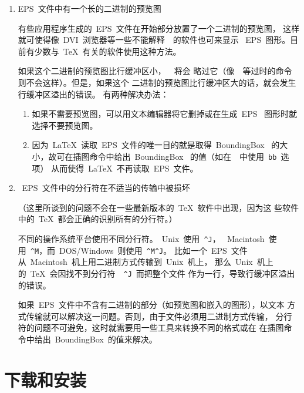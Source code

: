 \begin{enumerate}
	\item { EPS~文件中有一个长的二进制的预览图}
	
	有些应用程序生成的~EPS~文件在开始部分放置了一个二进制的预览图，
	这样就可使得像~DVI~浏览器等一些不能解释~\PS~的软件也可来显示
	~EPS~图形。目前有少数与~\TeX{}~有关的软件使用这种方法。
	
	如果这个二进制的预览图比行缓冲区小，~~将会
	略过它（像~~等过时的命令则不会这样）。但是，如果这个
	二进制的预览图比行缓冲区大的话，就会发生行缓冲区溢出的错误。
	有两种解决办法：
	
	\begin{enumerate}
		\item 如果不需要预览图，可以用文本编辑器将它删掉或在生成~EPS~
		图形时就选择不要预览图。
		\item 因为~\LaTeX{}~读取~EPS~文件的唯一目的就是取得~BoundingBox~
		的大小，故可在插图命令中给出~BoundingBox~
		的值（如在~~中使用~\texttt{bb}~选项）
		从而使得~\LaTeX{}~不再读取~EPS~文件。
	\end{enumerate}
	
	\item { ~EPS~文件中的分行符在不适当的传输中被损坏}
	
	（这里所谈到的问题不会在一些最新版本的~\TeX{}~软件中出现，因为这
	些软件中的~\TeX{}~都会正确的识别所有的分行符。）
	
	不同的操作系统平台使用不同分行符。~Unix~使用~\verb+^J+，
	~Macintosh~使用~\verb+^M+，而~DOS/Windows~则使用~\verb+^M^J+。
	比如一个~EPS~文件从~Macintosh~机上用二进制方式传输到~Unix~机上，
	那么~Unix~机上的~\TeX{}~会因找不到分行符~~\verb+^J+~而把整个文件
	作为一行，导致行缓冲区溢出的错误。
	
	如果~EPS~文件中不含有二进制的部分（如预览图和嵌入的图形），以文本
	方式传输就可以解决这一问题。否则，由于文件必须用二进制方式传输，
	分行符的问题不可避免，这时就需要用一些工具来转换不同的格式或在
	在插图命令中给出~BoundingBox~的值来解决。
\end{enumerate}

\section[下载和安装\GS]{下载和安装~~\GS}\label{sec:gs}

